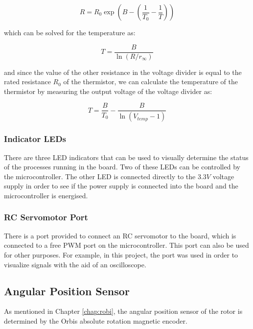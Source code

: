\begin{equation}
	R=R_{0}\exp({B-(\frac{1}{T_{0}}-\frac{1}{T})})  
\end{equation}

\noindent
which can be solved for the temperature as:

\begin{equation}
	T=\frac{B}{\ln(R/r_{\infty})}
\end{equation}

\noindent
and since the value of the other resistance in the voltage divider is equal to the rated resistance $R_{0}$ of the thermistor, we can calculate the temperature of the thermistor by measuring the output voltage of the voltage divider as:

\begin{equation}
	T = \frac{B}{T_{0}} - \frac{B}{\ln(V_{temp}-1)}
\end{equation}

\subsubsection{Indicator LEDs}

There are three LED indicators that can be used to visually determine the status of the processes running in the board. Two of these LEDs can be controlled by the microcontroller. The other LED is connected directly to the $3.3V$ voltage supply in order to see if the power supply is connected into the board and the microcontroller is energised.

\subsubsection{RC Servomotor Port}

There is a port provided to connect an RC servomotor to the board, which is connected to a free \ac{PWM} port on the microcontroller. This port can also be used for other purposes. For example, in this project, the port was used in order to visualize signals with the aid of an oscilloscope.

\subsection{Angular Position Sensor}

As mentioned in Chapter \ref{chap:robi}, the angular position sensor of the rotor is determined by the Orbis absolute rotation magnetic encoder. 

